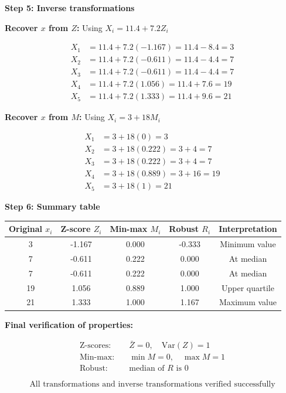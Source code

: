 \documentclass[12pt]{article}
\begin{document}
\begin{solution}
\textbf{Step 5: Inverse transformations}

\textbf{Recover \(x\) from \(Z\):} Using \(X_i = 11.4 + 7.2 Z_i\)

\begin{align*}
X_1 &= 11.4 + 7.2(-1.167) = 11.4 - 8.4 = 3  \\
X_2 &= 11.4 + 7.2(-0.611) = 11.4 - 4.4 = 7  \\
X_3 &= 11.4 + 7.2(-0.611) = 11.4 - 4.4 = 7  \\
X_4 &= 11.4 + 7.2(1.056) = 11.4 + 7.6 = 19  \\
X_5 &= 11.4 + 7.2(1.333) = 11.4 + 9.6 = 21
\end{align*}

\textbf{Recover \(x\) from \(M\):} Using \(X_i = 3 + 18M_i\)

\begin{align*}
X_1 &= 3 + 18(0) = 3  \\
X_2 &= 3 + 18(0.222) = 3 + 4 = 7  \\
X_3 &= 3 + 18(0.222) = 3 + 4 = 7  \\
X_4 &= 3 + 18(0.889) = 3 + 16 = 19  \\
X_5 &= 3 + 18(1) = 21
\end{align*}

\textbf{Step 6: Summary table}

\begin{center}
\begin{tabular}{|c|c|c|c|c|}
\hline
Original \(x_i\) & Z-score \(Z_i\) & Min-max \(M_i\) & Robust \(R_i\) & Interpretation \\
\hline
3 & -1.167 & 0.000 & -0.333 & Minimum value \\
7 & -0.611 & 0.222 & 0.000 & At median \\
7 & -0.611 & 0.222 & 0.000 & At median \\
19 & 1.056 & 0.889 & 1.000 & Upper quartile \\
21 & 1.333 & 1.000 & 1.167 & Maximum value \\
\hline
\end{tabular}
\end{center}

\textbf{Final verification of properties:}

\begin{align*}
\text{Z-scores:} &\quad \bar{Z} = 0, \quad \text{Var}(Z) = 1  \\
\text{Min-max:} &\quad \min M = 0, \quad \max M = 1  \\
\text{Robust:} &\quad \text{median of } R \text{ is } 0
\end{align*}

\[
\boxed{\text{All transformations and inverse transformations verified successfully}}
\]
\end{solution}
\end{document}
